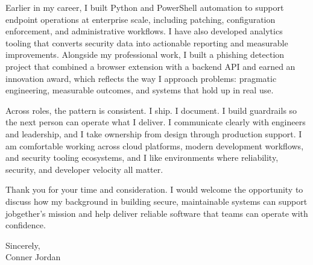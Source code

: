 \documentclass[letterpaper,11pt]{article}
\newcommand{\companyname}{jobgether}
\begin{document}
\vspace{16pt}

Earlier in my career, I built Python and PowerShell automation to support endpoint operations at enterprise scale, including patching, configuration enforcement, and administrative workflows. I have also developed analytics tooling that converts security data into actionable reporting and measurable improvements. Alongside my professional work, I built a phishing detection project that combined a browser extension with a backend API and earned an innovation award, which reflects the way I approach problems: pragmatic engineering, measurable outcomes, and systems that hold up in real use.

\vspace{16pt}

Across roles, the pattern is consistent. I ship. I document. I build guardrails so the next person can operate what I deliver. I communicate clearly with engineers and leadership, and I take ownership from design through production support. I am comfortable working across cloud platforms, modern development workflows, and security tooling ecosystems, and I like environments where reliability, security, and developer velocity all matter.

\vspace{16pt}

Thank you for your time and consideration. I would welcome the opportunity to discuss how my background in building secure, maintainable systems can support \companyname's mission and help deliver reliable software that teams can operate with confidence.

\vspace{16pt}

Sincerely,\\
Conner Jordan
\end{document}
